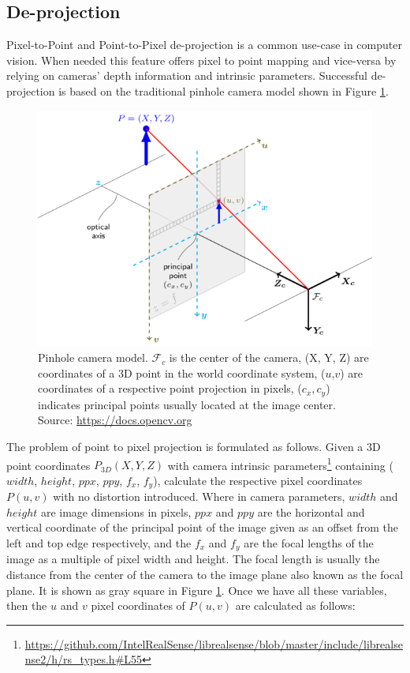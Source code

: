 \subsection{De-projection}
Pixel-to-Point and Point-to-Pixel de-projection is a common use-case in computer vision. When needed this feature offers pixel to point mapping and vice-versa by relying on cameras' depth information and intrinsic parameters. Successful de-projection is based on the traditional pinhole camera model \cite{Hartley:2003:MVG:861369} shown in Figure \ref{f2.6}. 

\begin{figure}[h]
    \centering
    \includegraphics[width=\textwidth]{Figures/pcm.png}
    \caption{Pinhole camera model. $\mathcal F_c$ is the center of the camera, (X, Y, Z) are coordinates of a 3D point in the world coordinate system, ($u$,$v$) are coordinates of a respective point projection in pixels, ($c_x, c_y$) indicates principal points usually located at the image center.  Source: \url{https://docs.opencv.org}}
    \label{f2.6}
\end{figure}


The problem of point to pixel projection is formulated as follows. Given a 3D point coordinates $P_{3D}(X, Y, Z)$ with camera intrinsic parameters\footnote{\url{https://github.com/IntelRealSense/librealsense/blob/master/include/librealsense2/h/rs\_types.h\#L55}} containing ($width$, $height$, $ppx$, $ppy$, $f_x$, $f_y$), calculate the respective pixel coordinates $P(u, v)$ with no distortion introduced. Where in camera parameters, $width$ and $height$ are image dimensions in pixels, $ppx$ and $ppy$ are the horizontal and vertical coordinate of the principal point of the image given as an offset from the left and top edge respectively, and the $f_x$ and $f_y$ are the focal lengths of the image as a multiple of pixel width and height. The focal length is usually the distance from the center of the camera to the image plane also known as the focal plane. It is shown as gray square in Figure \ref{f2.6}.  Once we have all these variables, then the $u$ and $v$ pixel coordinates of $P(u, v)$ are calculated as follows:

